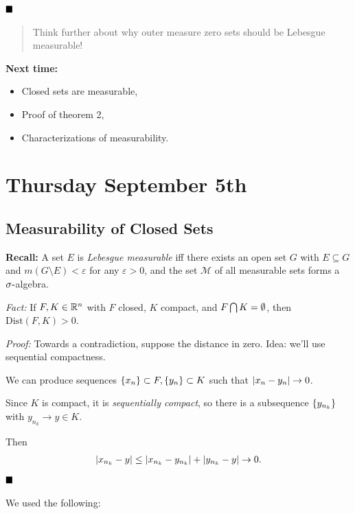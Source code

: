 \(\qed\)

\begin{quote}
Think further about why outer measure zero sets should be Lebesgue
measurable!
\end{quote}

\textbf{Next time:}

\begin{itemize}
\item
  Closed sets are measurable,
\item
  Proof of theorem 2,
\item
  Characterizations of measurability.
\end{itemize}

\hypertarget{thursday-september-5th}{%
\section{Thursday September 5th}\label{thursday-september-5th}}

\hypertarget{measurability-of-closed-sets}{%
\subsection{Measurability of Closed
Sets}\label{measurability-of-closed-sets}}

\textbf{Recall:} A set \(E\) is \emph{Lebesgue measurable} iff there
exists an open set \(G\) with \(E \subseteq G\) and
\(m(G\setminus E) < \varepsilon\) for any \(\varepsilon > 0\), and the
set \(\mathcal M\) of all measurable sets forms a
\(\sigma{\hbox{-}}\)algebra.

\emph{Fact:} If \(F, K \in {\mathbb{R}}^n\) with \(F\) closed, \(K\) compact, and
\(F \bigcap K = \emptyset\), then \(\mathrm{Dist}(F, K) > 0\).

\emph{Proof:} Towards a contradiction, suppose the distance in zero.
Idea: we'll use sequential compactness.

We can produce sequences
\(\left\{{x_n}\right\} \subset F, \left\{{y_n}\right\}\subset K\) such that
\({\left\lvert {x_n - y_n} \right\rvert} \to 0\).

Since \(K\) is compact, it is \emph{sequentially compact}, so there is a
subsequence \(\left\{{y_{n_k}}\right\}\) with \(y_{n_k} \to y \in K\).

Then
\begin{align*}
{\left\lvert {x_{n_k} - y} \right\rvert} \leq {\left\lvert {x_{n_k} - y_{n_k}} \right\rvert} + {\left\lvert {y_{n_k} - y} \right\rvert} \to 0.
\end{align*} \(\qed\)

We used the following:

